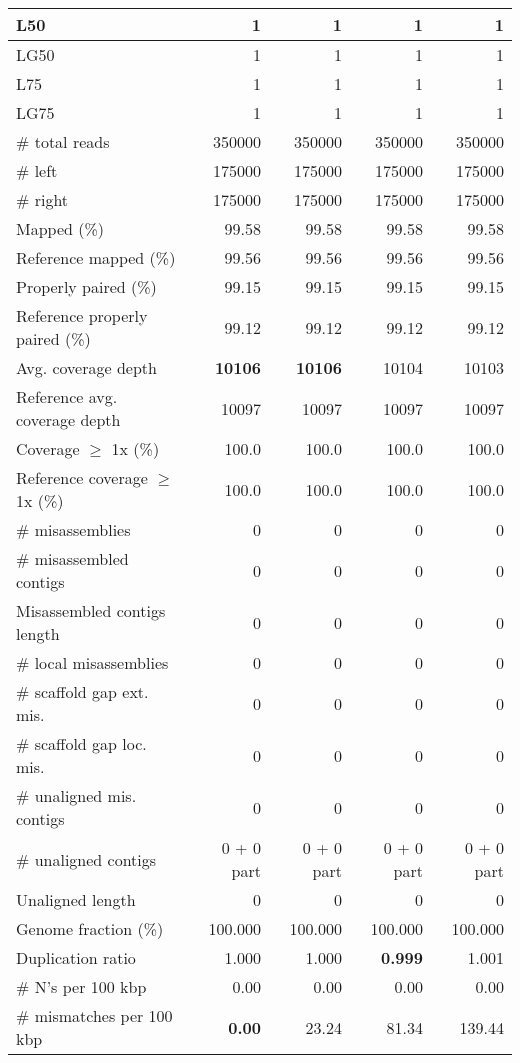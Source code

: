 \documentclass[12pt,a4paper]{article}
\begin{document}
\begin{table}[ht]
\begin{center}
\begin{tabular}{|l*{4}{|r}|}
L50 & 1 & 1 & 1 & 1 \\ \hline
LG50 & 1 & 1 & 1 & 1 \\ \hline
L75 & 1 & 1 & 1 & 1 \\ \hline
LG75 & 1 & 1 & 1 & 1 \\ \hline
\# total reads & 350000 & 350000 & 350000 & 350000 \\ \hline
\# left & 175000 & 175000 & 175000 & 175000 \\ \hline
\# right & 175000 & 175000 & 175000 & 175000 \\ \hline
Mapped (\%) & 99.58 & 99.58 & 99.58 & 99.58 \\ \hline
Reference mapped (\%) & 99.56 & 99.56 & 99.56 & 99.56 \\ \hline
Properly paired (\%) & 99.15 & 99.15 & 99.15 & 99.15 \\ \hline
Reference properly paired (\%) & 99.12 & 99.12 & 99.12 & 99.12 \\ \hline
Avg. coverage depth & {\bf 10106} & {\bf 10106} & 10104 & 10103 \\ \hline
Reference avg. coverage depth & 10097 & 10097 & 10097 & 10097 \\ \hline
Coverage $\geq$ 1x (\%) & 100.0 & 100.0 & 100.0 & 100.0 \\ \hline
Reference coverage $\geq$ 1x (\%) & 100.0 & 100.0 & 100.0 & 100.0 \\ \hline
\# misassemblies & 0 & 0 & 0 & 0 \\ \hline
\# misassembled contigs & 0 & 0 & 0 & 0 \\ \hline
Misassembled contigs length & 0 & 0 & 0 & 0 \\ \hline
\# local misassemblies & 0 & 0 & 0 & 0 \\ \hline
\# scaffold gap ext. mis. & 0 & 0 & 0 & 0 \\ \hline
\# scaffold gap loc. mis. & 0 & 0 & 0 & 0 \\ \hline
\# unaligned mis. contigs & 0 & 0 & 0 & 0 \\ \hline
\# unaligned contigs & 0 + 0 part & 0 + 0 part & 0 + 0 part & 0 + 0 part \\ \hline
Unaligned length & 0 & 0 & 0 & 0 \\ \hline
Genome fraction (\%) & 100.000 & 100.000 & 100.000 & 100.000 \\ \hline
Duplication ratio & 1.000 & 1.000 & {\bf 0.999} & 1.001 \\ \hline
\# N's per 100 kbp & 0.00 & 0.00 & 0.00 & 0.00 \\ \hline
\# mismatches per 100 kbp & {\bf 0.00} & 23.24 & 81.34 & 139.44 \\ \hline

\end{tabular}
\end{center}
\end{table}
\end{document}
